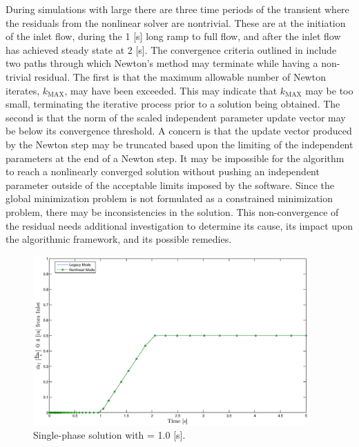 During simulations with large \dtmax{} there are three time periods of the transient where the residuals from the nonlinear solver are nontrivial.
These are at the initiation of the inlet flow, during the 1 [s] long ramp to full flow, and after the inlet flow has achieved steady state at 2 [s].
The convergence criteria outlined in  include two paths through which Newton's method may terminate while having a non-trivial residual.
The first is that the maximum allowable number of Newton iterates, $k_{\text{MAX}}$, may have been exceeded. 
This may indicate that $k_{\text{MAX}}$ may be too small, terminating the iterative process prior to a solution being obtained.
The second is that the norm of the scaled independent parameter update vector may be below its convergence threshold.
A concern is that the update vector produced by the Newton step may be truncated based upon the limiting of the independent parameters at the end of a Newton step.
It may be impossible for the algorithm to reach a nonlinearly converged solution without pushing an independent parameter outside of the acceptable limits imposed by the software.
Since the global minimization problem is not formulated as a constrained minimization problem, there may be inconsistencies in the solution.
This non-convergence of the residual needs additional investigation to determine its cause, its impact upon the algorithmic framework, and its possible remedies.


\begin{figure}[h!t]
\centering
\includegraphics[width=0.94\textwidth]{images/single_1em0.eps}
\caption{Single-phase solution with \dtmax{} = 1.0 {[s]}.}
\label{fig:single_1em1}
\end{figure}

